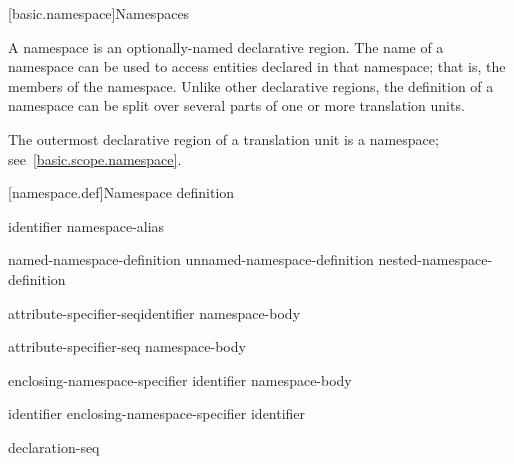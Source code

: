 [basic.namespace]{Namespaces}%

\pnum
A namespace is an optionally-named declarative region. The name of a
namespace can be used to access entities declared in that namespace;
that is, the members of the namespace. Unlike other declarative regions,
the definition of a namespace can be split over several parts of one or
more translation units.

\pnum
The outermost declarative region of a translation unit is a namespace;
see~\ref{basic.scope.namespace}.

[namespace.def]{Namespace definition}%
%

\begin{bnf}
\br
        identifier\br
        namespace-alias
\end{bnf}

\begin{bnf}
\br
        named-namespace-definition\br
        unnamed-namespace-definition\br
        nested-namespace-definition
\end{bnf}

\begin{bnf}
\br
          attribute-specifier-seq\opt identifier \terminal{\{} namespace-body \terminal{\}}
\end{bnf}

\begin{bnf}
\br
          attribute-specifier-seq\opt{} \terminal{\{} namespace-body \terminal{\}}
\end{bnf}

\begin{bnf}
\br
         enclosing-namespace-specifier \terminal{::} identifier \terminal{\{} namespace-body \terminal{\}}
\end{bnf}

\begin{bnf}
\br
        identifier\br
        enclosing-namespace-specifier \terminal{::} identifier
\end{bnf}

\begin{bnf}
\br
        declaration-seq\opt
\end{bnf}

